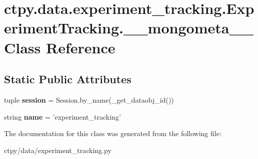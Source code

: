 \hypertarget{classctpy_1_1data_1_1experiment__tracking_1_1_experiment_tracking_1_1____mongometa____}{\section{ctpy.\-data.\-experiment\-\_\-tracking.\-Experiment\-Tracking.\-\_\-\-\_\-mongometa\-\_\-\-\_\- Class Reference}
\label{classctpy_1_1data_1_1experiment__tracking_1_1_experiment_tracking_1_1____mongometa____}
}
\subsection*{Static Public Attributes}
\begin{DoxyCompactItemize}
\item 
\hypertarget{classctpy_1_1data_1_1experiment__tracking_1_1_experiment_tracking_1_1____mongometa_____a8c7f435e39920150e0b6cd5dca3c74d4}{tuple {\bfseries session} = Session.\-by\-\_\-name(\-\_\-get\-\_\-dataobj\-\_\-id())}\label{classctpy_1_1data_1_1experiment__tracking_1_1_experiment_tracking_1_1____mongometa_____a8c7f435e39920150e0b6cd5dca3c74d4}

\item 
\hypertarget{classctpy_1_1data_1_1experiment__tracking_1_1_experiment_tracking_1_1____mongometa_____a96238041540d42ff08cdec8c68dbfdb2}{string {\bfseries name} = 'experiment\-\_\-tracking'}\label{classctpy_1_1data_1_1experiment__tracking_1_1_experiment_tracking_1_1____mongometa_____a96238041540d42ff08cdec8c68dbfdb2}

\end{DoxyCompactItemize}


The documentation for this class was generated from the following file\-:\begin{DoxyCompactItemize}
\item 
ctpy/data/experiment\-\_\-tracking.\-py\end{DoxyCompactItemize}
